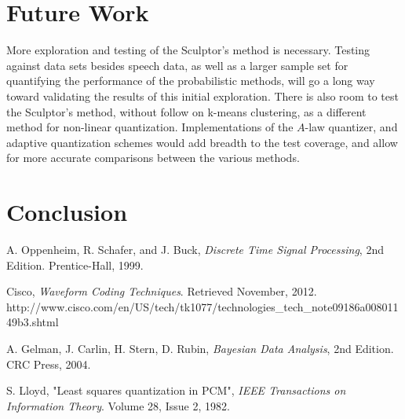 \documentclass[journal]{IEEEtran}
\begin{document}
\section{Future Work}
More exploration and testing of the Sculptor's method is necessary. Testing against data sets besides speech data, as well as a larger sample set for
quantifying the performance of the probabilistic methods, will go a long way toward validating the results of this initial exploration. There is also 
room to test the Sculptor's method, without follow on k-means clustering, as a different method for non-linear quantization. Implementations of the 
$A$-law quantizer, and adaptive quantization schemes would add breadth to the test coverage, and allow for more accurate comparisons between the 
various methods.

\section{Conclusion}
\begin{thebibliography}{1}
A. Oppenheim, R. Schafer, and J. Buck, \emph{Discrete Time Signal Processing}, 2nd Edition. Prentice-Hall, 1999.

Cisco, \emph{Waveform Coding Techniques}. Retrieved November, 2012. http://www.cisco.com/en/US/tech/tk1077/technologies\_tech\_note09186a00801149b3.shtml 

A. Gelman, J. Carlin, H. Stern, D. Rubin, \emph{Bayesian Data Analysis}, 2nd Edition. CRC Press, 2004.

S. Lloyd, "Least squares quantization in PCM", \emph{IEEE Transactions on Information Theory}. Volume 28, Issue 2, 1982.
\end{thebibliography}






\end{document}
